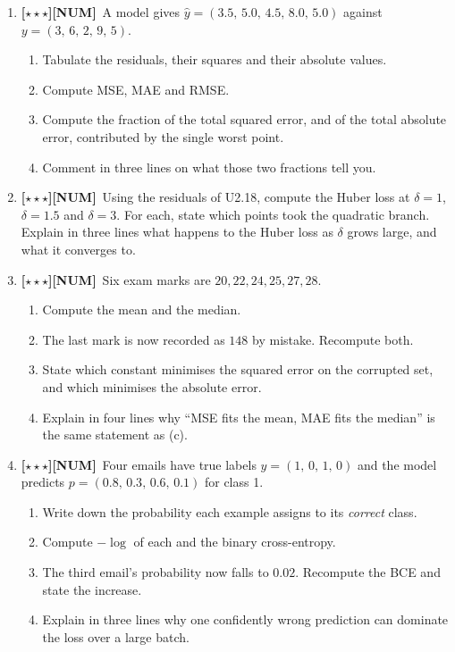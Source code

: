 \documentclass[11pt,a4paper]{article}
\newcommand{\LA}{{\footnotesize\textbf{[$\star\star\star$]}}}
\newcommand{\NUM}{{\footnotesize\textbf{[NUM]}}}
\newcommand{\Q}[1]{\item[\textbf{#1}]}
\begin{document}
\begin{enumerate}[leftmargin=2.2cm]
\Q{U2.18}\LA\NUM\ A model gives $\hat y = (3.5,\,5.0,\,4.5,\,8.0,\,5.0)$
  against $y = (3,\,6,\,2,\,9,\,5)$.
  \begin{enumerate}[label=(\alph*)]
    \item Tabulate the residuals, their squares and their absolute values.
    \item Compute MSE, MAE and RMSE.
    \item Compute the fraction of the total squared error, and of the total
      absolute error, contributed by the single worst point.
    \item Comment in three lines on what those two fractions tell you.
  \end{enumerate}
\Q{U2.19}\LA\NUM\ Using the residuals of U2.18, compute the Huber loss at
  $\delta = 1$, $\delta = 1.5$ and $\delta = 3$. For each, state which points
  took the quadratic branch. Explain in three lines what happens to the Huber
  loss as $\delta$ grows large, and what it converges to.
\Q{U2.20}\LA\NUM\ Six exam marks are $20, 22, 24, 25, 27, 28$.
  \begin{enumerate}[label=(\alph*)]
    \item Compute the mean and the median.
    \item The last mark is now recorded as $148$ by mistake. Recompute both.
    \item State which constant minimises the squared error on the corrupted
      set, and which minimises the absolute error.
    \item Explain in four lines why ``MSE fits the mean, MAE fits the median''
      is the same statement as (c).
  \end{enumerate}
\Q{U2.21}\LA\NUM\ Four emails have true labels $y = (1,\,0,\,1,\,0)$ and the
  model predicts $p = (0.8,\,0.3,\,0.6,\,0.1)$ for class 1.
  \begin{enumerate}[label=(\alph*)]
    \item Write down the probability each example assigns to its \emph{correct}
      class.
    \item Compute $-\log$ of each and the binary cross-entropy.
    \item The third email's probability now falls to $0.02$. Recompute the BCE
      and state the increase.
    \item Explain in three lines why one confidently wrong prediction can
      dominate the loss over a large batch.
  \end{enumerate}

\end{enumerate}
\end{document}
